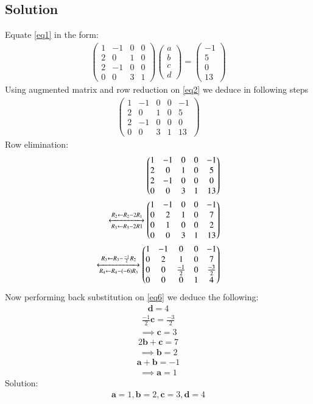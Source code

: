 \documentclass[journal,12pt,twocolumn]{IEEEtran}
\newcommand{\myvec}[1]{\ensuremath{\begin{pmatrix}#1\end{pmatrix}}}
\let\vec\mathbf
\begin{document}
\subsection{Solution}
Equate \eqref{eq1} in the form:
\begin{align}
\label{eq2}
\myvec{1&-1&0&0\\2&0&1&0\\2&-1&0&0\\0&0&3&1}
\myvec{a\\b\\c\\d}=
\myvec{-1\\5\\0\\13}
\end{align}
Using augmented matrix and row reduction on \eqref{eq2} we deduce in following steps
\begin{align}
\myvec{1&-1&0&0&-1\\2&0&1&0&5\\2&-1&0&0&0\\0&0&3&1&13}
\end{align}
Row elimination:
\begin{align}
\myvec{1&-1&0&0&-1\\2&0&1&0&5\\2&-1&0&0&0\\0&0&3&1&13}\\
    \xleftrightarrow[R_3\leftarrow R_3-2R1]{R_2 \leftarrow R_2-2R_1}
	\myvec{1&-1&0&0&-1\\0&2&1&0&7\\0&1&0&0&2\\0&0&3&1&13}\\
	\xleftrightarrow[R_4\leftarrow R_4-(-6)R_3]{R_3 \leftarrow R_3- \frac{-1}{2}R_2}
    \label{eq6}
	\myvec{1&-1&0&0&-1\\0&2&1&0&7\\0&0&\frac{-1}{2}&0&\frac{-3}{2}\\0&0&0&1&4}
\end{align}
Now performing back substitution on \eqref{eq6} we deduce the following:
\begin{align}
\vec{d}=4
\end{align}
\begin{align}
\frac{-1}{2}\vec{c}=\frac{-3}{2}
\end{align}
\begin{align}
\implies\vec{c}=3
\end{align}
\begin{align}
2\vec{b}+\vec{c}= 7
\end{align}
\begin{align}
\implies\vec{b}=2
\end{align}
\begin{align}
\vec{a}+\vec{b}= -1
\end{align}
\begin{align}
\implies\vec{a}=1
\end{align}
Solution:
\begin{align*}
\vec{a}=1,\vec{b}=2,\vec{c}=3,\vec{d}=4
\end{align*}
\end{document}
